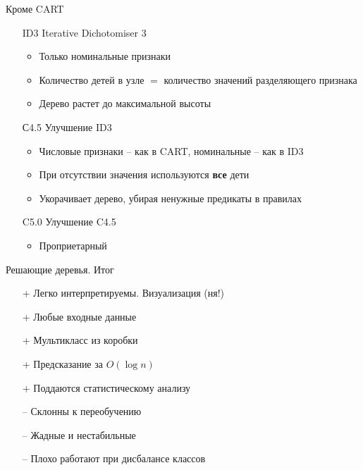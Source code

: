 \documentclass[10pt]{beamer}
\begin{document}
\begin{frame}{Кроме  CART}

\begin{itemize}

\item[ID3] Iterative Dichotomiser 3 
	\begin{itemize}
	\item Только номинальные признаки
	\item Количество детей в узле $=$ количество значений разделяющего признака
	\item Дерево растет до максимальной высоты
	\end{itemize}
	
\item[С4.5] Улучшение ID3
	\begin{itemize}
	\item Числовые признаки -- как в CART, номинальные -- как в ID3
	\item При отсутствии значения используются {\bf все} дети
	\item Укорачивает дерево, убирая ненужные предикаты в правилах
	\end{itemize}
	
\item[C5.0] Улучшение C4.5
	\begin{itemize}
	\item Проприетарный
	\end{itemize}
		
\end{itemize}

\end{frame}

\begin{frame}{Решающие деревья. Итог}

\begin{itemize}
\item[+] Легко интерпретируемы. Визуализация (ня!)
\item[+] Любые входные данные
\item[+] Мультикласс из коробки
\item[+] Предсказание за $O(\log n)$
\item[+] Поддаются статистическому анализу
\end{itemize}

\begin{itemize}
\item[--] Склонны к переобучению
\item[--] Жадные и  нестабильные
\item[--] Плохо работают при дисбалансе классов
\end{itemize}

\end{frame}
\end{document}
